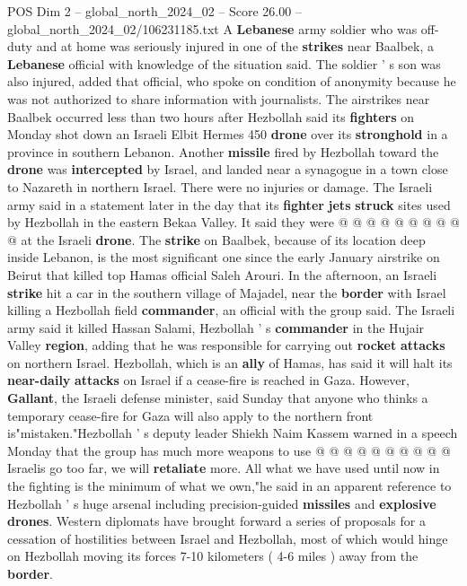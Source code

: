\begin{textsample}{POS Dim 2 – global\_north\_2024\_02 – Score 26.00 – global\_north\_2024\_02/106231185.txt}
A \textbf{Lebanese} army soldier who was off-duty and at home was seriously injured in one of the \textbf{strikes} near Baalbek, a \textbf{Lebanese} official with knowledge of the situation said.
The soldier ' s son was also injured, added that official, who spoke on condition of anonymity because he was not authorized to share information with journalists.
The airstrikes near Baalbek occurred less than two hours after Hezbollah said its \textbf{fighters} on Monday shot down an Israeli Elbit Hermes 450 \textbf{drone} over its \textbf{stronghold} in a province in southern Lebanon.
Another \textbf{missile} fired by Hezbollah toward the \textbf{drone} was \textbf{intercepted} by Israel, and landed near a synagogue in a town close to Nazareth in northern Israel.
There were no injuries or damage.
The Israeli army said in a statement later in the day that its \textbf{fighter} \textbf{jets} \textbf{struck} sites used by Hezbollah in the eastern Bekaa Valley.
It said they were @ @ @ @ @ @ @ @ @ @ at the Israeli \textbf{drone}.
The \textbf{strike} on Baalbek, because of its location deep inside Lebanon, is the most significant one since the early January airstrike on Beirut that killed top Hamas official Saleh Arouri.
In the afternoon, an Israeli \textbf{strike} hit a car in the southern village of Majadel, near the \textbf{border} with Israel killing a Hezbollah field \textbf{commander}, an official with the group said.
The Israeli army said it killed Hassan Salami, Hezbollah ' s \textbf{commander} in the Hujair Valley \textbf{region}, adding that he was responsible for carrying out \textbf{rocket} \textbf{attacks} on northern Israel.
Hezbollah, which is an \textbf{ally} of Hamas, has said it will halt its \textbf{near-daily} \textbf{attacks} on Israel if a cease-fire is reached in Gaza.
However, \textbf{Gallant}, the Israeli defense minister, said Sunday that anyone who thinks a temporary cease-fire for Gaza will also apply to the northern front is"mistaken."Hezbollah ' s deputy leader Shiekh Naim Kassem warned in a speech Monday that the group has much more weapons to use @ @ @ @ @ @ @ @ @ @ Israelis go too far, we will \textbf{retaliate} more.
All what we have used until now in the fighting is the minimum of what we own,"he said in an apparent reference to Hezbollah ' s huge arsenal including precision-guided \textbf{missiles} and \textbf{explosive} \textbf{drones}.
Western diplomats have brought forward a series of proposals for a cessation of hostilities between Israel and Hezbollah, most of which would hinge on Hezbollah moving its forces 7-10 kilometers ( 4-6 miles ) away from the \textbf{border}.

\end{textsample}
